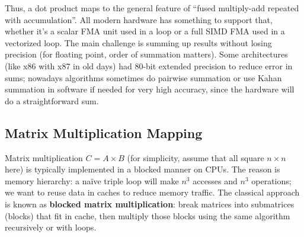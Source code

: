 Thus, a dot product maps to the general feature of “fused multiply-add repeated with accumulation”. All modern hardware has something to support that, whether it’s a scalar FMA unit used in a loop or a full SIMD FMA used in a vectorized loop. The main challenge is summing up results without losing precision (for floating point, order of summation matters). Some architectures (like x86 with x87 in old days) had 80-bit extended precision to reduce error in sums; nowadays algorithms sometimes do pairwise summation or use Kahan summation in software if needed for very high accuracy, since the hardware will do a straightforward sum.

\subsection{Matrix Multiplication Mapping}  
Matrix multiplication $C = A \times B$ (for simplicity, assume that all square $n \times n$ here) is typically implemented in a blocked manner on CPUs. The reason is memory hierarchy: a naïve triple loop will make $n^3$ accesses and $n^3$ operations; we want to reuse data in caches to reduce memory traffic. The classical approach is known as \textbf{blocked matrix multiplication}: break matrices into submatrices (blocks) that fit in cache, then multiply those blocks using the same algorithm recursively or with loops.

